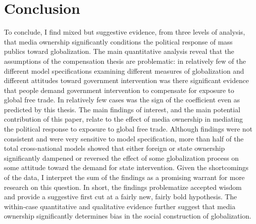\documentclass[12pt]{report}
\begin{document}
\section{Conclusion}

To conclude, I find mixed but suggestive evidence, from three levels of analysis, that media
ownership significantly conditions the political response of mass publics toward globalization. The
main quantitative analysis reveal that the assumptions of the compensation thesis are problematic:
in relatively few of the different model specifications examining different measures of
globalization and different attitudes toward government intervention was there significant evidence
that people demand government intervention to compensate for exposure to global free trade. In
relatively few cases was the sign of the coefficient even as predicted by this thesis. The main
findings of interest, and the main potential contribution of this paper, relate to the effect of
media ownership in mediating the political response to exposure to global free trade. Although
findings were not consistent and were very sensitive to model specification, more than half of the
total cross-national models showed that either foreign or state ownership significantly dampened or
reversed the effect of some globalization process on some attitude toward the demand for state
intervention. Given the shortcomings of the data, I interpret the sum of the findings as a promising
warrant for more research on this question. In short, the findings problematize accepted wisdom and
provide a suggestive first cut at a fairly new, fairly bold hypothesis. The within-case quantitative
and qualitative evidence further suggest that media ownership significantly determines bias in the
social construction of globalization.




\end{document}
